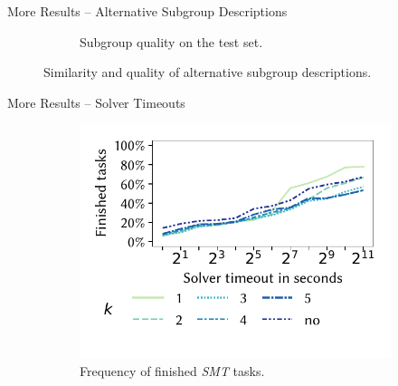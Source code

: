 \documentclass[en, navbaroff, handout]{sdqbeamer}
\begin{document}
\begin{frame}[t]{More Results -- Alternative Subgroup Descriptions}
\begin{figure}
\begin{subfigure}[t]{0.4\textwidth}
			\caption{Subgroup quality on the test set.}
			\label{fig:csd:alternatives-test-nwracc}
		\end{subfigure}
		\caption*{
			Similarity and quality of alternative subgroup descriptions.
		}
		\label{fig:csd:alternatives:appendix}
	\end{figure}
\end{frame}

\begin{frame}[t]{More Results -- Solver Timeouts}
	\begin{figure}
		\centering
		\begin{subfigure}[t]{0.4\textwidth}
			\centering
			\includegraphics[width=\textwidth, trim=10 25 10 10, clip]{plots/csd-timeouts-finished-tasks.pdf}
			\caption{
				Frequency of finished \emph{SMT} tasks.
			}
			\label{fig:csd:timeouts-finished-tasks}
		\end{subfigure}
		\hspace{\kitcolumnsep}
		\begin{subfigure}[t]{0.4\textwidth}
			\centering

\end{subfigure}
\end{figure}
\end{frame}
\end{document}
